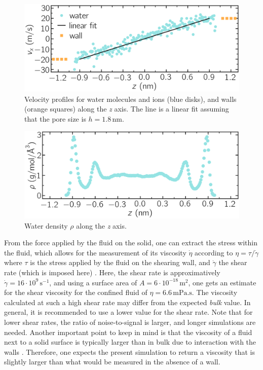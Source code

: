 \documentclass[9pt,tutorial]{livecoms}
\begin{document}
\begin{figure}
\centering
\includegraphics[width=\linewidth]{NANOSHEAR-velocity}
\caption{Velocity profiles for water molecules and ions (blue disks), and walls
(orange squares) along the \textit{z} axis. The line is a linear fit assuming
that the pore size is $h = 1.8\,\text{nm}$.}
\label{fig:NANOSHEAR-velocity}
\end{figure}

\begin{figure}
\centering
\includegraphics[width=\linewidth]{NANOSHEAR-density}
\caption{Water density $\rho$ along the \textit{z} axis.}
\label{fig:NANOSHEAR-density}
\end{figure}

From the force applied by the fluid on the solid, one can extract the stress
within the fluid, which allows for the measurement of its viscosity $\dot{\eta}$
according to $\eta = \tau / \dot{\gamma}$ where $\tau$ is the stress applied by
the fluid on the shearing wall, and $\dot{\gamma}$ the shear rate (which is
imposed here) \cite{gravelle2021violations}. Here, the shear rate is
approximatively $\dot{\gamma} = 16 \cdot 10^9\,\text{s}^{-1}$, and using a
surface area of $A = 6 \cdot 10^{-18}\,\text{m}^2$, one gets an estimate for
the shear viscosity for the confined fluid of $\eta = 6.6\,\text{mPa.s}$. The
viscosity calculated at such a high shear rate may differ from the expected
\textit{bulk} value. In general, it is recommended to use a lower value for the
shear rate. Note that for lower shear rates, the ratio of noise-to-signal is
larger, and longer simulations are needed. Another important point to keep in
mind is that the viscosity of a fluid next to a solid surface is typically larger
than in bulk due to interaction with the walls \cite{wolde-kidanInterplayInterfacialViscosity2021}.
Therefore, one expects the present simulation to return a viscosity that is slightly
larger than what would be measured in the absence of a wall.
\end{document}
